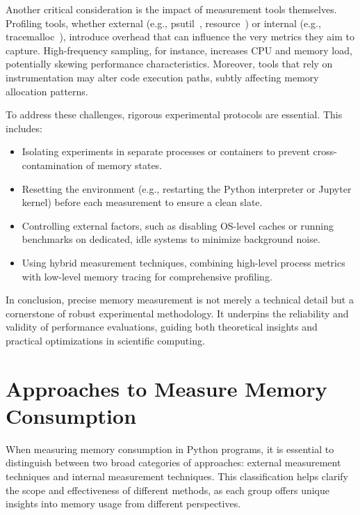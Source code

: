 Another critical consideration is the impact of measurement tools themselves.
Profiling tools, whether external (e.g., psutil~\cite{psutil}, resource~\cite{importlib_resources}) or internal (e.g., tracemalloc~\cite{tracemalloc}), introduce overhead that can influence the very metrics they aim to capture.
High-frequency sampling, for instance, increases \ac{CPU} and memory load, potentially skewing performance characteristics.
Moreover, tools that rely on instrumentation may alter code execution paths, subtly affecting memory allocation patterns.

To address these challenges, rigorous experimental protocols are essential.
This includes:

\begin{itemize}
    \item Isolating experiments in separate processes or containers to prevent cross-contamination of memory states.
    \item Resetting the environment (e.g., restarting the Python interpreter or Jupyter kernel) before each measurement to ensure a clean slate.
    \item Controlling external factors, such as disabling \ac{OS}-level caches or running benchmarks on dedicated, idle systems to minimize background noise.
    \item Using hybrid measurement techniques, combining high-level process metrics with low-level memory tracing for comprehensive profiling.
\end{itemize}

In conclusion, precise memory measurement is not merely a technical detail but a cornerstone of robust experimental methodology.
It underpins the reliability and validity of performance evaluations, guiding both theoretical insights and practical optimizations in scientific computing.


\section{Approaches to Measure Memory Consumption}
\label{sec:mmc-approaches}

When measuring memory consumption in Python programs, it is essential to distinguish between two broad categories of approaches: external measurement techniques and internal measurement techniques.
This classification helps clarify the scope and effectiveness of different methods, as each group offers unique insights into memory usage from different perspectives.

